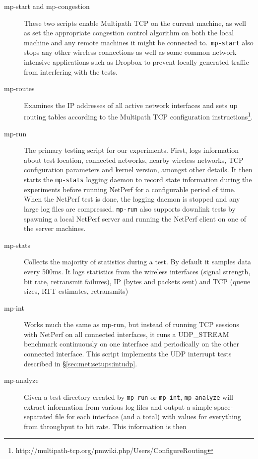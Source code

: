 \begin{description}
  \item[mp-start and mp-congestion]
    These two scripts enable Multipath TCP on the current machine, as well as
    set the appropriate congestion control algorithm on both the local machine
    and any remote machines it might be connected to.\ \texttt{mp-start} also
    stops any other wireless connections as well as some common
    network-intensive applications such as Dropbox to prevent locally generated traffic
    from interfering with the tests.
  \item[mp-routes]
    Examines the IP addresses of all active network interfaces and sets up
    routing tables according to the Multipath TCP configuration
    instructions\footnote{http://multipath-tcp.org/pmwiki.php/Users/ConfigureRouting}.
  \item[mp-run]
    The primary testing script for our experiments. First, logs information
    about test location, connected networks, nearby wireless networks, TCP
    configuration parameters and kernel version, amongst other details. It then starts
    the \texttt{mp-stats} logging daemon to record state information during the
    experiments before running NetPerf for a configurable period of
    time. When the NetPerf test is done, the logging daemon is stopped and any
    large log files are compressed. \texttt{mp-run} also supports downlink tests
    by spawning a local NetPerf server and running the NetPerf client on one of
    the server machines.
  \item[mp-stats]
    Collects the majority of statistics during a test. By default it samples
    data every 500ms. It logs statistics from the wireless interfaces (signal
    strength, bit rate, retransmit failures), IP (bytes and packets sent) and
    TCP (queue sizes, RTT estimates, retransmits)
  \item[mp-int]
    Works much the same as mp-run, but instead of running TCP sessions with
    NetPerf on all connected interfaces, it runs a UDP\_STREAM benchmark
    continuously on one interface and periodically on the other connected
    interface. This script implements the UDP interrupt tests described in
    \S\ref{sec:met:setups:intudp}.
  \item[mp-analyze]
    Given a test directory created by \texttt{mp-run} or \texttt{mp-int},
    \texttt{mp-analyze} will extract information from various log files and
    output a simple space-separated file for each interface (and a total) with
    values for everything from throughput to bit rate. This information is then

\end{description}
